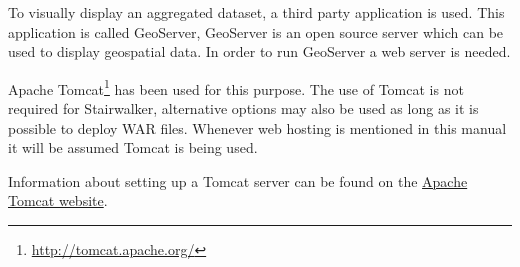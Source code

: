 To visually display an aggregated dataset, a third party application is
used. This application is called GeoServer, GeoServer is an open source
server which can be used to display geospatial data. In order to run
GeoServer a web server is needed. 

Apache Tomcat\footnote{\url{http://tomcat.apache.org/}} has been used for
this purpose.  The use of Tomcat is not required for Stairwalker,
alternative options may also be used as long as it is possible to deploy
WAR files.  Whenever web hosting is mentioned in this manual it will be
assumed Tomcat is being used.

Information about setting up a Tomcat server can be found on the
\href{http://tomcat.apache.org/}{\textsf{Apache Tomcat website}}.
